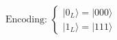 \documentclass[preview]{standalone}
\begin{document}
\begin{align*}
\text{Encoding: } \begin{cases} |0_L\rangle = |000\rangle \\ |1_L\rangle = |111\rangle \end{cases}
\end{align*}
\end{document}
